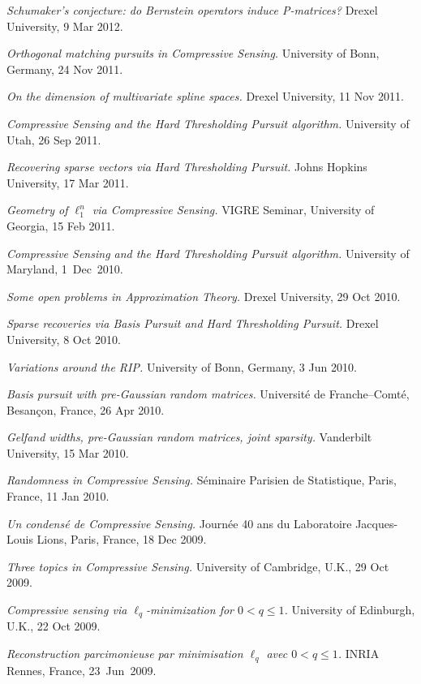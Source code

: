 \documentclass[11pt]{article}
\begin{document}
\item {\sl Schumaker's conjecture: do Bernstein operators induce P-matrices?} Drexel University, 9 Mar 2012.
\item {\sl Orthogonal matching pursuits in Compressive Sensing.} University of Bonn, Germany, 24 Nov 2011.
\item {\sl On the dimension of multivariate spline spaces.} Drexel University, 11 Nov 2011.
\item {\sl Compressive Sensing and the Hard Thresholding Pursuit algorithm.} University of Utah, 26 Sep 2011.
\item {\sl Recovering sparse vectors via Hard Thresholding Pursuit.} Johns Hopkins University, 17 Mar 2011.
\item {\sl Geometry of $\ell_1^n$ via Compressive Sensing.} VIGRE Seminar, University of Georgia, 15 Feb 2011.
\item {\sl Compressive Sensing and the Hard Thresholding Pursuit algorithm.\hspace{-1.5mm}}  University of Maryland, 1~Dec~2010.
\item {\sl Some open problems in Approximation Theory.} Drexel University, 29 Oct 2010.
\item {\sl Sparse recoveries via Basis Pursuit and Hard Thresholding Pursuit.} Drexel University, 8 Oct 2010.
\item {\sl Variations around the RIP.} University of Bonn, Germany, 3 Jun 2010.
\item {\sl Basis pursuit with pre-Gaussian random matrices.} 
Universit\'e de Franche--Comt\'e, Besan\c{c}on, France, 26 Apr 2010.
\item {\sl Gelfand widths, pre-Gaussian random matrices, joint sparsity.} Vanderbilt University, 15 Mar 2010.
\item {\sl Randomness in Compressive Sensing.} S\'eminaire Parisien de Statistique, Paris, France, 11 Jan 2010.
\item {\sl Un condens\'e de Compressive Sensing.} Journ\'ee 40 ans du Laboratoire Jacques-Louis Lions, Paris, France, 18 Dec 2009.
\item {\sl Three topics in Compressive Sensing.} University of Cambridge, U.K., 29 Oct 2009.
\item {\sl Compressive sensing via $\ell_q$-minimization for $0 < q \le 1$.} University of Edinburgh, U.K., 22 Oct 2009.
\item {\sl Reconstruction parcimonieuse par minimisation $\ell_q$ avec $0<q \le 1$.} INRIA Rennes, France, 23~Jun~2009.
\end{document}
